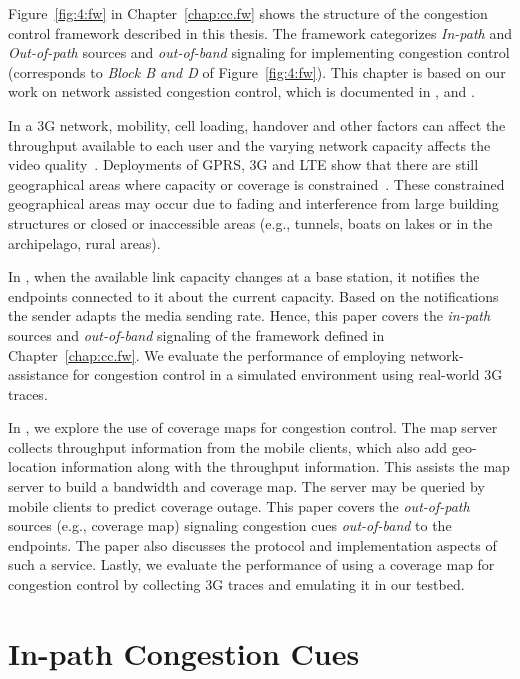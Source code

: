 Figure~\ref{fig:4:fw} in Chapter~\ref{chap:cc.fw} shows the structure of the
congestion control framework described in this thesis. The framework
categorizes \emph{In-path} and \emph{Out-of-path} sources and \emph{out-of-band}
signaling for implementing congestion control (corresponds to
\emph{Block B and D} of Figure~\ref{fig:4:fw}). This chapter is based on our
work on network assisted congestion control, which is documented in
,  and \cite{glass:patent}.

In a 3G network, mobility, cell loading, handover and other factors can
affect the throughput available to each user and the varying network capacity
affects the video quality~\cite{diaz2007evaluating}. Deployments of GPRS, 3G
and LTE show that there are still geographical areas where capacity or
coverage is constrained~\cite{Curcio:glass, 6576402}. These constrained
geographical areas may occur due to fading and interference from large
building structures or closed or inaccessible areas (e.g., tunnels, boats on
lakes or in the archipelago, rural areas).

In , when the available link capacity changes at a base
station, it notifies the endpoints connected to it about the current capacity.
Based on the notifications the sender adapts the media sending rate. Hence,
this paper covers the \emph{in-path} sources and \emph{out-of-band} signaling
of the framework defined in Chapter~\ref{chap:cc.fw}. We evaluate the
performance of employing network-assistance for congestion control in a
simulated environment using real-world 3G traces.

In , we explore the use of coverage maps for congestion
control. The map server collects throughput information from the mobile
clients, which also add geo-location information along with the throughput
information. This assists the map server to build a bandwidth and coverage
map. The server may be queried by mobile clients to predict coverage outage.
This paper covers the \emph{out-of-path} sources (e.g., coverage map)
signaling congestion cues \emph{out-of-band} to the endpoints. The paper also
discusses the protocol and implementation aspects of such a service. Lastly,
we evaluate the performance of using a coverage map for congestion control by
collecting 3G traces and emulating it in our testbed.

\section{In-path Congestion Cues}

